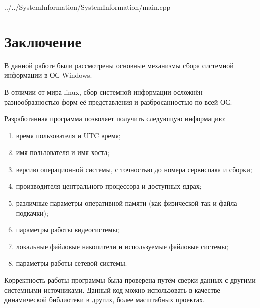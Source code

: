 \documentclass[a4paper, 12pt]{report}		%
\begin{document}

{../../SystemInformation/SystemInformation/main.cpp}

\chapter*{Заключение}

\vspace{1em}

В данной работе были рассмотрены основные механизмы сбора системной информации в ОС Windows.
\vspace{1em}

В отличии от мира linux, сбор системной информации осложнён разнообразностью форм её представления и разбросанностью по всей ОС.
\vspace{1em}

Разработанная программа позволяет получить следующую информацию:
\begin{enumerate}
\item время пользователя и UTC время;
\item имя пользователя и имя хоста;
\item версию операционной системы, с точностью до номера сервиспака и сборки;
\item производителя центрального процессора и доступных ядрах;
\item различные параметры оперативной памяти (как физической так и файла подкачки);
\item параметры работы видеосистемы;
\item локальные файловые накопители и используемые файловые системы;
\item параметры работы сетевой системы.
\end{enumerate}
\vspace{1em}

Корректность работы программы была проверена путём сверки данных с другими системными источниками. Данный код можно использовать в качестве динамической библиотеки в других, более масштабных проектах.
\end{document}
